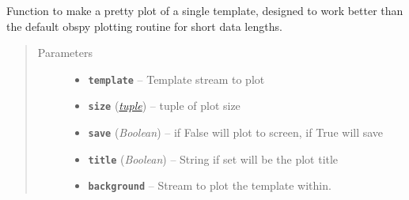 \documentclass[a4paper,10pt,english]{sphinxmanual}
\begin{document}

\begin{fulllineitems}
\label{utils:EQcorrscan_plotting.pretty_template_plot}
Function to make a pretty plot of a single template, designed to work better
than the default obspy plotting routine for short data lengths.
\begin{quote}\begin{description}
\item[{Parameters}] \leavevmode\begin{itemize}
\item {} 
\textbf{\texttt{template}} -- Template stream to plot

\item {} 
\textbf{\texttt{size}} (\href{https://docs.python.org/library/functions.html\#tuple}{\emph{tuple}}) -- tuple of plot size

\item {} 
\textbf{\texttt{save}} (\emph{Boolean}) -- if False will plot to screen, if True will save

\item {} 
\textbf{\texttt{title}} (\emph{Boolean}) -- String if set will be the plot title

\item {} 
\textbf{\texttt{background}} -- Stream to plot the template within.

\end{itemize}

\end{description}\end{quote}

\end{fulllineitems}

\end{document}
